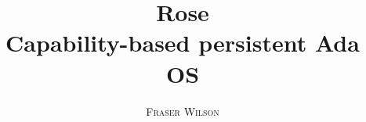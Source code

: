 \title{\Huge \textbf{Rose} \\ \huge Capability-based persistent Ada OS}
\author{\textsc{Fraser Wilson}}

